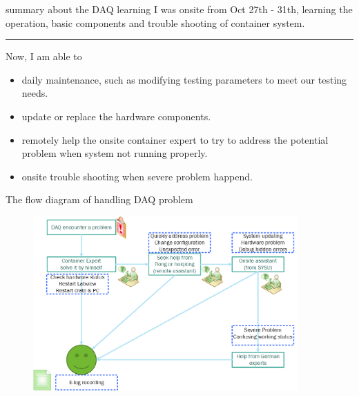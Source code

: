 \documentclass[11pt,compress,xcolor=x11names,UTF8]{beamer}
\begin{document}
\begin{frame}{summary about the DAQ learning}
I was onsite from Oct 27th - 31th, learning the operation, basic components and trouble shooting of container system. \\
\vspace{.5cm}
\hrule{\textwidth}
\vspace{.5cm}
Now, I am able to  
\begin{itemize}
\item daily maintenance, such as modifying testing parameters to meet our testing needs.  
\item update or replace the hardware components.
\item remotely help the onsite container expert to try to address the potential problem when system  not running properly.
\item onsite trouble shooting when severe problem happend.

\end{itemize}

\end{frame}
\begin{frame}{The  flow diagram of handling DAQ problem}
\begin{figure}
\centering
\includegraphics[width=0.9\textwidth]{daq} %
\end{figure}

\end{frame}

\begin{frame}
\end{frame}
\end{document}
